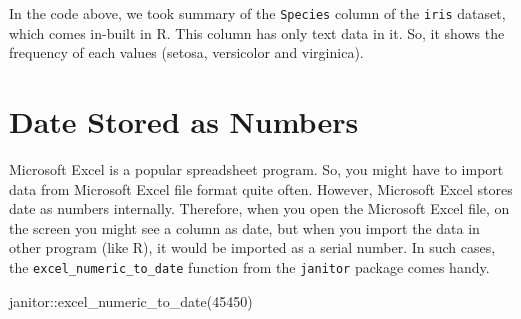 \documentclass[
  letterpaper,
  paper =a4,
  twoside,
  openright,
  headsepline,
  footsepline,
  listof = totocnumbered,
  chapterprefix = true,
  firstiscover,
  parskip = full*]{scrbook}
\newenvironment{Shaded}{\begin{snugshade}}{\end{snugshade}}
\newcommand{\DecValTok}[1]{\textcolor[rgb]{0.68,0.00,0.00}{#1}}
\newcommand{\FunctionTok}[1]{\textcolor[rgb]{0.28,0.35,0.67}{#1}}
\newcommand{\NormalTok}[1]{\textcolor[rgb]{0.00,0.23,0.31}{#1}}
\newcommand{\SpecialCharTok}[1]{\textcolor[rgb]{0.37,0.37,0.37}{#1}}
\begin{document}
\begin{Shaded}
\end{Shaded}

\begin{table}

\caption{\label{tbl-iris-summary}Summary of `Species' column of `iris'
dataset}


\end{table}%

In the code above, we took summary of the \texttt{Species} column of the
\texttt{iris} dataset, which comes in-built in R. This column has only
text data in it. So, it shows the frequency of each values (setosa,
versicolor and virginica).

\section{Date Stored as Numbers}\label{date-stored-as-numbers}

Microsoft Excel is a popular spreadsheet program. So, you might have to
import data from Microsoft Excel file format quite often. However,
Microsoft Excel stores date as numbers internally. Therefore, when you
open the Microsoft Excel file, on the screen you might see a column as
date, but when you import the data in other program (like R), it would
be imported as a serial number. In such cases, the
\texttt{excel\_numeric\_to\_date} function from the \texttt{janitor}
package comes handy.

\begin{Shaded}
\begin{Highlighting}[]
\NormalTok{janitor}\SpecialCharTok{::}\FunctionTok{excel\_numeric\_to\_date}\NormalTok{(}\DecValTok{45450}\NormalTok{)}
\end{Highlighting}
\end{Shaded}
\end{document}
